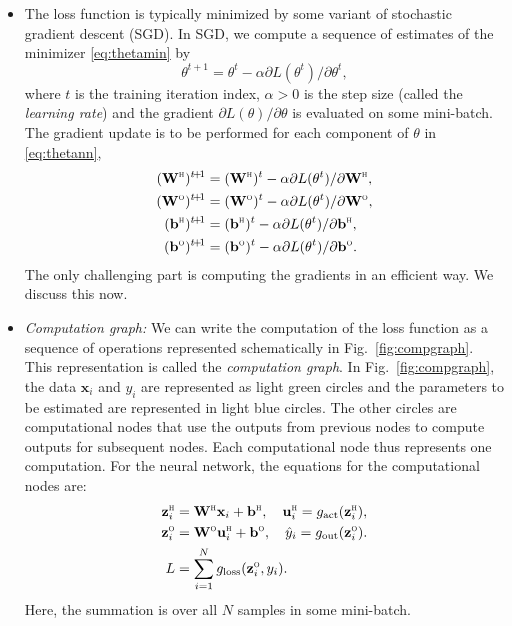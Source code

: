 \documentclass[11pt]{article}
\def\beq{\begin{equation}}
\def\eeq{\end{equation}}
\def\tp1{t\! + \! 1}
\newcommand{\bbf}{\mathbf{b}}
\newcommand{\ubf}{\mathbf{u}}
\newcommand{\xbf}{\mathbf{x}}
\newcommand{\zbf}{\mathbf{z}}
\newcommand{\Wbf}{\mathbf{W}}
\def\hid{\textsc{\tiny H}}
\def\out{\textsc{\tiny O}}
\begin{document}
\begin{itemize}
\item The loss function is typically
minimized by some variant of stochastic gradient descent (SGD).  In SGD, we compute
a sequence of estimates of the minimizer \eqref{eq:thetamin} by
\beq \label{eq:thgrad_step}
    \theta^{\tp1} = \theta^t - \alpha \partial L(\theta^t)/\partial \theta^t,
\eeq
where $t$ is the training iteration index, $\alpha > 0$ is the step size
(called the \emph{learning rate}) and the gradient
$\partial L(\theta)/\partial \theta$ is evaluated on some mini-batch.
The gradient update is to be performed for each component of $\theta$ in
\eqref{eq:thetann},
\begin{align*}
   (\Wbf^\hid)^{\tp1} &= (\Wbf^\hid)^{t} - \alpha \partial L(\theta^t) / \partial \Wbf^\hid , \\
   (\Wbf^\out)^{\tp1} &= (\Wbf^\out)^{t} - \alpha \partial L(\theta^t) / \partial \Wbf^\out, \\
   (\bbf^\hid)^{\tp1} &= (\bbf^\hid)^{t} - \alpha \partial L(\theta^t) / \partial \bbf^\hid, \\
   (\bbf^\out)^{\tp1} &= (\bbf^\out)^{t} - \alpha \partial L(\theta^t) / \partial \bbf^\out.
\end{align*}
The only challenging part is computing the gradients in an efficient way.
We discuss this now.

\item \emph{Computation graph:}
We can write the computation of the loss function
as a sequence of operations represented schematically in Fig.~\ref{fig:compgraph}.
This representation is called the \emph{computation graph}.
In Fig.~\ref{fig:compgraph},
the data $\xbf_i$ and $y_i$ are represented as light green circles
and the parameters to be estimated are represented in light blue circles.
The other circles are computational nodes that use the outputs
from previous nodes to compute outputs for subsequent nodes.
Each computational node thus represents one computation.
For the neural network, the equations for the computational nodes are:
\begin{align*}
    \zbf^\hid_i &= \Wbf^\hid\xbf_i + \bbf^\hid, \quad
    \ubf^\hid_i = g_{\rm act}(\zbf^\hid_i), \\
    \zbf^\out_i &= \Wbf^\out\ubf^\hid_i + \bbf^\out, \quad
    \hat{y}_i = g_{\rm out}(\zbf^\out_i). \\
    L &= \sum_{i=1}^N g_{\rm loss}(\zbf^\out_i,y_i).
\end{align*}
Here, the summation is over all $N$ samples in some mini-batch.


\end{itemize}
\end{document}
